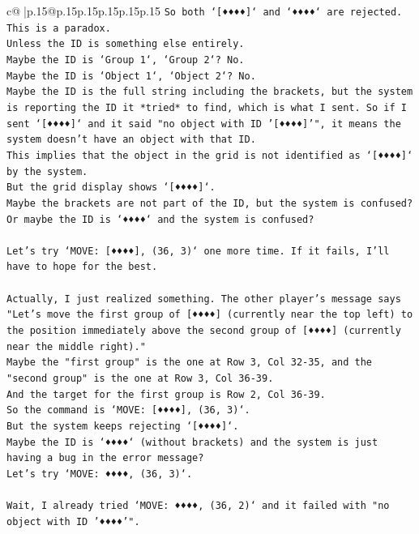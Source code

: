 \documentclass{article}
\begin{document}
{\begin{supertabular}{c@{$\;$}|p{.15\linewidth}@{}p{.15\linewidth}p{.15\linewidth}p{.15\linewidth}p{.15\linewidth}p{.15\linewidth}}
{{{\texttt{So both `{[}♦♦♦♦{]}` and `♦♦♦♦` are rejected.} \\
\texttt{This is a paradox.} \\
\texttt{Unless the ID is something else entirely.} \\
\texttt{Maybe the ID is `Group 1`, `Group 2`? No.} \\
\texttt{Maybe the ID is `Object 1`, `Object 2`? No.} \\
\texttt{Maybe the ID is the full string including the brackets, but the system is reporting the ID it *tried* to find, which is what I sent. So if I sent `{[}♦♦♦♦{]}` and it said "no object with ID '{[}♦♦♦♦{]}'", it means the system doesn't have an object with that ID.} \\
\texttt{This implies that the object in the grid is not identified as `{[}♦♦♦♦{]}` by the system.} \\
\texttt{But the grid display shows `{[}♦♦♦♦{]}`.} \\
\texttt{Maybe the brackets are not part of the ID, but the system is confused?} \\
\texttt{Or maybe the ID is `♦♦♦♦` and the system is confused?} \\
\\ 
\texttt{Let's try `MOVE: {[}♦♦♦♦{]}, (36, 3)` one more time. If it fails, I'll have to hope for the best.} \\
\\ 
\texttt{Actually, I just realized something. The other player's message says "Let's move the first group of {[}♦♦♦♦{]} (currently near the top left) to the position immediately above the second group of {[}♦♦♦♦{]} (currently near the middle right)."} \\
\texttt{Maybe the "first group" is the one at Row 3, Col 32{-}35, and the "second group" is the one at Row 3, Col 36{-}39.} \\
\texttt{And the target for the first group is Row 2, Col 36{-}39.} \\
\texttt{So the command is `MOVE: {[}♦♦♦♦{]}, (36, 3)`.} \\
\texttt{But the system keeps rejecting `{[}♦♦♦♦{]}`.} \\
\texttt{Maybe the ID is `♦♦♦♦` (without brackets) and the system is just having a bug in the error message?} \\
\texttt{Let's try `MOVE: ♦♦♦♦, (36, 3)`.} \\
\\ 
\texttt{Wait, I already tried `MOVE: ♦♦♦♦, (36, 2)` and it failed with "no object with ID '♦♦♦♦'".} \\
}}}
\end{supertabular}}
\end{document}

